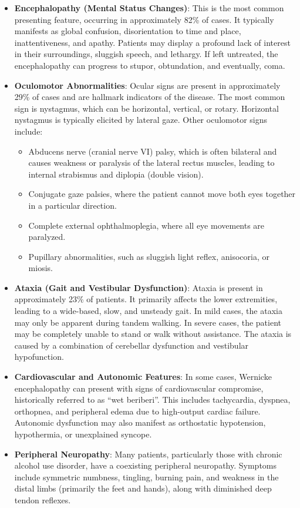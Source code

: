 \begin{itemize}
    \item \textbf{Encephalopathy (Mental Status Changes)}: This is the most common presenting feature, occurring in approximately 82\% of cases. It typically manifests as global confusion, disorientation to time and place, inattentiveness, and apathy. Patients may display a profound lack of interest in their surroundings, sluggish speech, and lethargy. If left untreated, the encephalopathy can progress to stupor, obtundation, and eventually, coma.
    \item \textbf{Oculomotor Abnormalities}: Ocular signs are present in approximately 29\% of cases and are hallmark indicators of the disease. The most common sign is nystagmus, which can be horizontal, vertical, or rotary. Horizontal nystagmus is typically elicited by lateral gaze. Other oculomotor signs include:
    \begin{itemize}
        \item Abducens nerve (cranial nerve VI) palsy, which is often bilateral and causes weakness or paralysis of the lateral rectus muscles, leading to internal strabismus and diplopia (double vision).
        \item Conjugate gaze palsies, where the patient cannot move both eyes together in a particular direction.
        \item Complete external ophthalmoplegia, where all eye movements are paralyzed.
        \item Pupillary abnormalities, such as sluggish light reflex, anisocoria, or miosis.
    \end{itemize}
    \item \textbf{Ataxia (Gait and Vestibular Dysfunction)}: Ataxia is present in approximately 23\% of patients. It primarily affects the lower extremities, leading to a wide-based, slow, and unsteady gait. In mild cases, the ataxia may only be apparent during tandem walking. In severe cases, the patient may be completely unable to stand or walk without assistance. The ataxia is caused by a combination of cerebellar dysfunction and vestibular hypofunction.
    \item \textbf{Cardiovascular and Autonomic Features}: In some cases, Wernicke encephalopathy can present with signs of cardiovascular compromise, historically referred to as ``wet beriberi''. This includes tachycardia, dyspnea, orthopnea, and peripheral edema due to high-output cardiac failure. Autonomic dysfunction may also manifest as orthostatic hypotension, hypothermia, or unexplained syncope.
    \item \textbf{Peripheral Neuropathy}: Many patients, particularly those with chronic alcohol use disorder, have a coexisting peripheral neuropathy. Symptoms include symmetric numbness, tingling, burning pain, and weakness in the distal limbs (primarily the feet and hands), along with diminished deep tendon reflexes.
\end{itemize}

